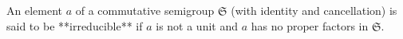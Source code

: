 An element $a$ of a commutative semigroup $\mathfrak{S}$ (with identity and cancellation) is said to be **irreducible** if $a$ is not a unit and $a$ has no proper factors in $\mathfrak{S}$.
